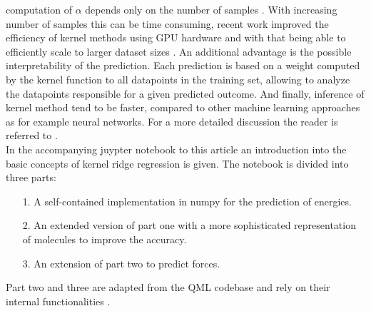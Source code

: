 \documentclass[9pt,bestpractices]{livecoms}
\begin{document}
computation of $\alpha$ depends only on the number of samples
\cite{murphyMachineLearningProbabilistic2012}. With increasing number of samples
this can be time consuming, recent work improved the efficiency of kernel
methods using GPU hardware and with that being able to efficiently scale to
larger dataset sizes \cite{meantiKernelMethodsRoof2020}.  An additional
advantage is the possible interpretability of the prediction. Each prediction is
based on a weight computed by the kernel function to all datapoints in the
training set, allowing to analyze the datapoints responsible for a given
predicted outcome. And finally, inference of kernel method tend to be faster,
compared to other machine learning approaches as for example neural networks.
For a more detailed discussion the reader is referred to
\cite{murphyMachineLearningProbabilistic2012, vuUnderstandingKernelRidge2015}.
\\ In the accompanying juypter notebook to this article an introduction into the
basic concepts of kernel ridge regression is given. The notebook is divided into
three parts:
\begin{itemize}
    \item[1.] A self-contained implementation in numpy for the prediction of
energies.
    \item[2.] An extended version of part one with a more sophisticated
representation of  molecules to improve the accuracy.
    \item[3.] An extension of part two to predict forces. 
\end{itemize}
Part two and three are adapted from the QML codebase and rely on
their internal functionalities \cite{christensen2017qml}.


\end{document}
